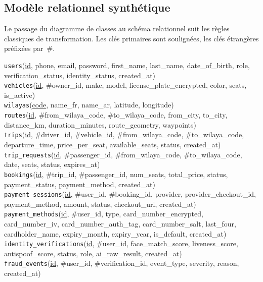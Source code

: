 \subsection{Modèle relationnel synthétique}
\label{sec:modele-relationnel}

Le passage du diagramme de classes au schéma relationnel suit les règles classiques de transformation. Les clés primaires sont soulignées, les clés étrangères préfixées par~\#.

\begin{highlight}[breakable=false]
\singlespacing\footnotesize
\texttt{users}(\underline{id}, phone, email, password, first\_name, last\_name, date\_of\_birth, role, verification\_status, identity\_status, created\_at)\\[1pt]
\texttt{vehicles}(\underline{id}, \#owner\_id, make, model, license\_plate\_encrypted, color, seats, is\_active)\\[1pt]
\texttt{wilayas}(\underline{code}, name\_fr, name\_ar, latitude, longitude)\\[1pt]
\texttt{routes}(\underline{id}, \#from\_wilaya\_code, \#to\_wilaya\_code, from\_city, to\_city, distance\_km, duration\_minutes, route\_geometry, waypoints)\\[1pt]
\texttt{trips}(\underline{id}, \#driver\_id, \#vehicle\_id, \#from\_wilaya\_code, \#to\_wilaya\_code, departure\_time, price\_per\_seat, available\_seats, status, created\_at)\\[1pt]
\texttt{trip\_requests}(\underline{id}, \#passenger\_id, \#from\_wilaya\_code, \#to\_wilaya\_code, date, seats, status, expires\_at)\\[1pt]
\texttt{bookings}(\underline{id}, \#trip\_id, \#passenger\_id, num\_seats, total\_price, status, payment\_status, payment\_method, created\_at)\\[1pt]
\texttt{payment\_sessions}(\underline{id}, \#user\_id, \#booking\_id, provider, provider\_checkout\_id, payment\_method, amount, status, checkout\_url, created\_at)\\[1pt]
\texttt{payment\_methods}(\underline{id}, \#user\_id, type, card\_number\_encrypted, card\_number\_iv, card\_number\_auth\_tag, card\_number\_salt, last\_four, cardholder\_name, expiry\_month, expiry\_year, is\_default, created\_at)\\[1pt]
\texttt{identity\_verifications}(\underline{id}, \#user\_id, face\_match\_score, liveness\_score, antispoof\_score, status, role, ai\_raw\_result, created\_at)\\[1pt]
\texttt{fraud\_events}(\underline{id}, \#user\_id, \#verification\_id, event\_type, severity, reason, created\_at)\\[1pt]

\end{highlight}
